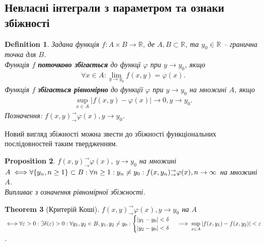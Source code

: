 \documentclass[a4paper, 10pt]{article}
\def\huge{\displaystyle}
\theoremstyle{theoremdd}
\newtheorem{theorem}{Theorem}[subsection]
\theoremstyle{theoremdd}
\theoremstyle{theoremdd}
\newtheorem{definition}[theorem]{Definition}
\theoremstyle{theoremdd}
\theoremstyle{theoremdd}
\theoremstyle{theoremdd}
\newtheorem{proposition}[theorem]{Proposition}
\theoremstyle{theoremdd}
\theoremstyle{theoremdd}
\theoremstyle{theoremdd}
\begin{document}
\subsection{Невласні інтеграли з параметром та ознаки збіжності}
\begin{definition}
Задана функція $f \colon A \times B \to \mathbb{R}$, де $A,B \subset \mathbb{R}$, та $y_0 \in \mathbb{R}$ -- гранична точка для $B$.\\
Функція $f$ \textbf{поточково збігається} до функцї $\varphi$ при $y \to y_0$, якщо
\begin{align*}
\forall x \in A: \lim_{y \to y_0} f(x,y) = \varphi(x).
\end{align*}
Функція $f$ \textbf{збігається рівномірно} до функції $\varphi$ при $y \to y_0$ на множині $A$, якщо
\begin{align*}
\sup_{x \in A} |f(x,y) - \varphi(x)| \to 0, y \to y_0.
\end{align*}
Позначення: $f(x,y)^\rightarrow_\rightarrow \varphi(x), y \to y_0$.
\end{definition}

Новий вигляд збіжності можна звести до збіжності функціональних послідовностей таким твердженням.

\begin{proposition}
$f(x,y)^\rightarrow_\rightarrow \varphi(x),\ y \to y_0$ на множині $A \iff \\
\forall \{y_n, n \geq 1\} \subset B: \forall n \geq 1: y_n \neq y_0: f(x,y_n)^\rightarrow_\rightarrow \varphi(x), n \to \infty$ на множині $A$.\\
\textit{Випливає з означення рівномірної збіжності.}
\end{proposition}

\begin{theorem}[Критерій Коші]
$f(x,y)^\rightarrow_\rightarrow \varphi(x), y \to y_0$ на $A$ $\iff \\ \forall \varepsilon > 0: \exists \delta(\varepsilon) > 0: \forall y_1,y_2 \in B, y_1,y_2 \neq y_0: \begin{cases} |y_1-y_0| < \delta \\ |y_2-y_0| < \delta \end{cases} \implies \huge\sup_{x \in A} |f(x,y_1)-f(x,y_2)| < \varepsilon$.\\
\end{theorem}
\end{document}

